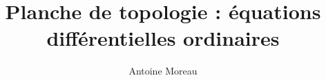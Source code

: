 \documentclass[a4paper,10pt]{article}
\title{Planche de topologie : \'equations diff\'erentielles ordinaires}
\author{Antoine Moreau}
\begin{document}
\maketitle

\begin{abstract}

\end{abstract}


\end{document}
